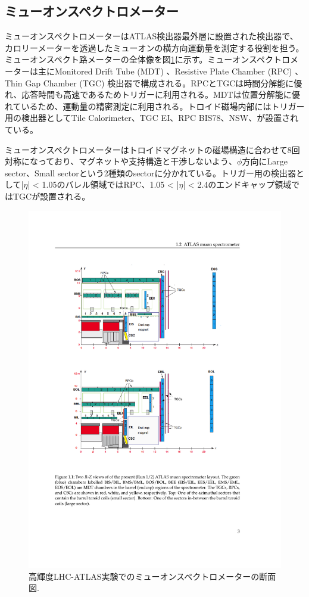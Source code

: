 \subsection{ミューオンスペクトロメーター}
\label{subsec_Muonspectrometer}
ミューオンスペクトロメーターはATLAS検出器最外層に設置された検出器で、カロリーメーターを透過したミューオンの横方向運動量を測定する役割を担う。ミューオンスペクト路メーターの全体像を図\ref{Muonspectrometer2}に示す。ミューオンスペクトロメーターは主にMonitored Drift Tube  (MDT) 、Resistive Plate Chamber  (RPC) 、Thin Gap Chamber  (TGC)  検出器で構成される。RPCとTGCは時間分解能に優れ、応答時間も高速であるためトリガーに利用される。MDTは位置分解能に優れているため、運動量の精密測定に利用される。トロイド磁場内部にはトリガー用の検出器としてTile Calorimeter、TGC EI、RPC BIS78、NSW、が設置されている。

ミューオンスペクトロメーターはトロイドマグネットの磁場構造に合わせて8回対称になっており、マグネットや支持構造と干渉しないよう、$\phi$方向にLarge sector、Small sectorという2種類のsectorに分かれている。トリガー用の検出器として|$\eta$| < 1.05のバレル領域ではRPC、1.05 < |$\eta$| < 2.4のエンドキャップ領域ではTGCが設置される。

\begin{figure} 
\centering
\includegraphics[width=16cm]{fig/Intro/Muonspectrometer.pdf}
\caption[高輝度LHC-ATLAS実験でのミューオンスペクトロメーターの断面図]{高輝度LHC-ATLAS実験でのミューオンスペクトロメーターの断面図.\cite{tdr_phase2muon_2017017}
}
\label{Muonspectrometer2}
\end{figure}

